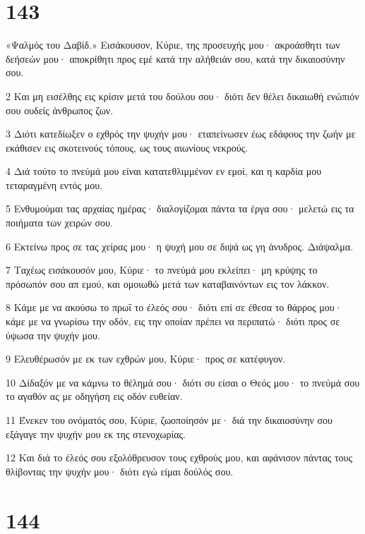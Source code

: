 \chapter{143}

\par «Ψαλμός του Δαβίδ.» Εισάκουσον, Κύριε, της προσευχής μου· ακροάσθητι των δεήσεών μου· αποκρίθητι προς εμέ κατά την αλήθειάν σου, κατά την δικαιοσύνην σου.
\par 2 Και μη εισέλθης εις κρίσιν μετά του δούλου σου· διότι δεν θέλει δικαιωθή ενώπιόν σου ουδείς άνθρωπος ζων.
\par 3 Διότι κατεδίωξεν ο εχθρός την ψυχήν μου· εταπείνωσεν έως εδάφους την ζωήν με εκάθισεν εις σκοτεινούς τόπους, ως τους αιωνίους νεκρούς.
\par 4 Διά τούτο το πνεύμά μου είναι κατατεθλιμμένον εν εμοί, και η καρδία μου τεταραγμένη εντός μου.
\par 5 Ενθυμούμαι τας αρχαίας ημέρας· διαλογίζομαι πάντα τα έργα σου· μελετώ εις τα ποιήματα των χειρών σου.
\par 6 Εκτείνω προς σε τας χείρας μου· η ψυχή μου σε διψά ως γη άνυδρος. Διάψαλμα.
\par 7 Ταχέως εισάκουσόν μου, Κύριε· το πνεύμά μου εκλείπει· μη κρύψης το πρόσωπόν σου απ εμού, και ομοιωθώ μετά των καταβαινόντων εις τον λάκκον.
\par 8 Κάμε με να ακούσω το πρωΐ το έλεός σου· διότι επί σε έθεσα το θάρρος μου· κάμε με να γνωρίσω την οδόν, εις την οποίαν πρέπει να περιπατώ· διότι προς σε ύψωσα την ψυχήν μου.
\par 9 Ελευθέρωσόν με εκ των εχθρών μου, Κύριε· προς σε κατέφυγον.
\par 10 Δίδαξόν με να κάμνω το θέλημά σου· διότι συ είσαι ο Θεός μου· το πνεύμά σου το αγαθόν ας με οδηγήση εις οδόν ευθείαν.
\par 11 Ένεκεν του ονόματός σου, Κύριε, ζωοποίησόν με· διά την δικαιοσύνην σου εξάγαγε την ψυχήν μου εκ της στενοχωρίας.
\par 12 Και διά το έλεός σου εξολόθρευσον τους εχθρούς μου, και αφάνισον πάντας τους θλίβοντας την ψυχήν μου· διότι εγώ είμαι δούλός σου.

\chapter{144}

